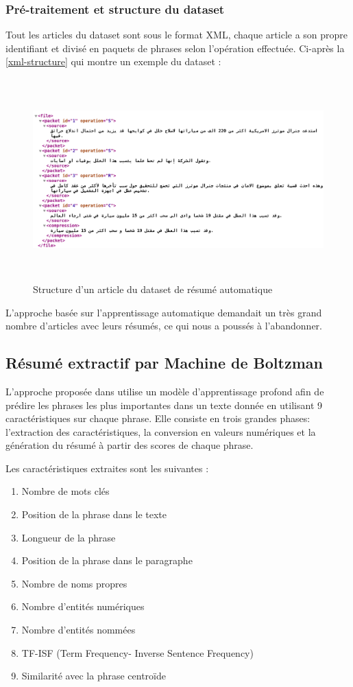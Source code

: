         \subsubsection{Pré-traitement et structure du dataset}
        Tout les articles du dataset sont sous le format XML, chaque article a son propre identifiant et divisé en paquets de phrases selon l'opération effectuée. Ci-après la \autoref{xml-structure} qui montre un exemple du dataset : 
        \begin{figure}[H]
            \centering
            \includegraphics[height=220pt,width=430pt]{img/chapter4/xml.png}
            \caption{Structure d'un article du dataset de résumé automatique}
            \label{xml-structure}
        \end{figure}
        L'approche basée sur l'apprentissage automatique demandait un très grand nombre d'articles avec leurs résumés, ce qui nous a poussés à l'abandonner.

    \subsection{Résumé extractif par Machine de Boltzman}
    L'approche proposée dans \cite{boltzman} utilise un modèle d'apprentissage profond afin de prédire les phrases les plus importantes dans un texte donnée en utilisant 9 caractéristiques sur chaque phrase. Elle consiste en trois grandes phases: l'extraction des caractéristiques, la conversion en valeurs numériques et la génération du résumé à partir des scores de chaque phrase. 

    Les caractéristiques extraites sont les suivantes :
    \begin{enumerate}
        \item{Nombre de mots clés}
        \item{Position de la phrase dans le texte}
        \item{Longueur de la phrase}
        \item{Position de la phrase dans le paragraphe}
        \item{Nombre de noms propres}
        \item{Nombre d'entités numériques}
        \item{Nombre d'entités nommées}
        \item{TF-ISF (Term Frequency- Inverse Sentence Frequency)}
        \item{Similarité avec la phrase centroïde}
    \end{enumerate} 

